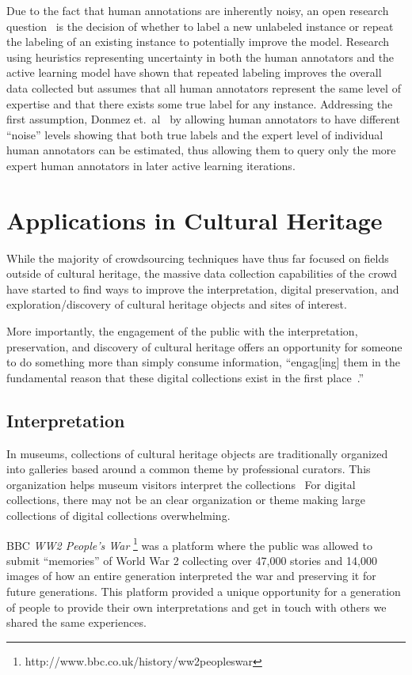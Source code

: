\documentclass[10pt,twocolumn]{article}
\begin{document}
Due to the fact that human annotations are inherently noisy, an open research
question~\cite{Settles2010} is the decision of whether to label a new 
unlabeled instance or repeat the labeling of an existing instance to 
potentially improve the model. Research~\cite{Sheng2008} using heuristics
representing uncertainty in both the human annotators and the active learning 
model have shown that repeated labeling improves the overall data collected but
assumes that all human annotators represent the same level of expertise and
that there exists some true label for any instance. Addressing the first 
assumption, Donmez et.\ al~\cite{Donmez2009} by allowing human annotators to
have different ``noise'' levels showing that both true labels and the 
expert level of individual human annotators can be estimated, thus allowing
them to query only the more expert human annotators in later active learning
iterations.

\section{Applications in Cultural Heritage}
\label{sec:applications-heritage}
While the majority of crowdsourcing techniques have thus far focused on fields
outside of cultural heritage, the massive data collection capabilities of the
crowd have started to find ways to improve the interpretation, digital 
preservation, and exploration/discovery of cultural heritage objects and sites
of interest.

More importantly, the engagement of the public with the interpretation, 
preservation, and discovery of cultural heritage offers an opportunity for
someone to do something more than simply consume information, ``engag[ing] them
in the fundamental reason that these digital collections exist in the
first place~\cite{Owens2013}.''

\subsection{Interpretation}

In museums, collections of cultural heritage objects are traditionally organized
into galleries based around a common theme by professional curators. This
organization helps museum visitors interpret the collections~\cite{Aletras2012}
For digital collections, there may not be an clear organization or theme making
large collections of digital collections overwhelming. 

BBC \textit{WW2 People's War}
\footnote{http://www.bbc.co.uk/history/ww2peopleswar} was a platform
where the public was allowed to submit ``memories'' of World War 2 collecting 
over 47,000 stories and 14,000 images of how an entire generation 
interpreted the war and preserving it for future generations. This platform
provided a unique opportunity for a generation of people to provide their 
own interpretations and get in touch with others we shared the same 
experiences.
\end{document}
